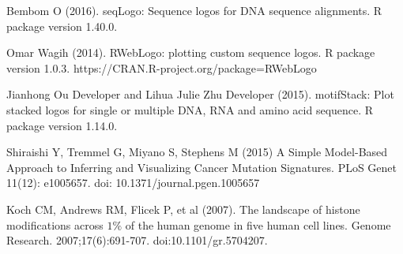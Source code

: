 \documentclass[12pt]{article}\usepackage[]{graphicx}\usepackage[usenames,dvipsnames]{color}
\begin{document}
\begin{thebibliography}{1}

Bembom O (2016).
\newblock seqLogo: Sequence logos for DNA sequence alignments.
\newblock R package version 1.40.0.

Omar Wagih (2014).
\newblock RWebLogo: plotting custom sequence logos.
\newblock R package version 1.0.3. https://CRAN.R-project.org/package=RWebLogo

Jianhong Ou Developer and Lihua Julie Zhu Developer (2015).
\newblock  motifStack: Plot stacked logos for single or multiple DNA, RNA and amino acid sequence.
\newblock  R package version 1.14.0.

Shiraishi Y, Tremmel G, Miyano S, Stephens M (2015)
\newblock A Simple Model-Based Approach to Inferring and Visualizing Cancer Mutation Signatures.
\newblock PLoS Genet 11(12): e1005657. doi: 10.1371/journal.pgen.1005657

Koch CM, Andrews RM, Flicek P, et al (2007).
\newblock The landscape of histone modifications across $1 \%$ of the human genome in five human cell lines.
\newblock Genome Research. 2007;17(6):691-707. doi:10.1101/gr.5704207.

\end{thebibliography}
\end{document}
